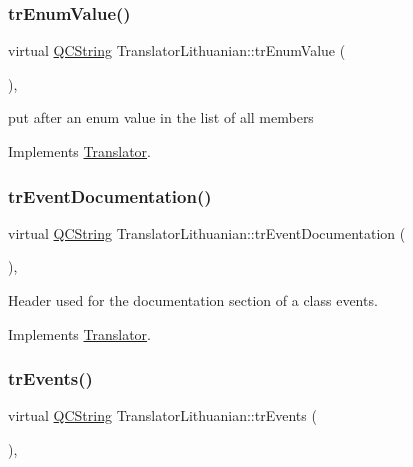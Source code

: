 \subsubsection{\texorpdfstring{trEnumValue()}{trEnumValue()}}
{\footnotesize\ttfamily virtual \mbox{\hyperlink{class_q_c_string}{Q\+C\+String}} Translator\+Lithuanian\+::tr\+Enum\+Value (\begin{DoxyParamCaption}{ }\end{DoxyParamCaption})\hspace{0.3cm}{\ttfamily [inline]}, {\ttfamily [virtual]}}

put after an enum value in the list of all members 

Implements \mbox{\hyperlink{class_translator}{Translator}}.

\mbox{\label{class_translator_lithuanian_adec683c693165e685a6275c8a525c8e7}} 
\subsubsection{\texorpdfstring{trEventDocumentation()}{trEventDocumentation()}}
{\footnotesize\ttfamily virtual \mbox{\hyperlink{class_q_c_string}{Q\+C\+String}} Translator\+Lithuanian\+::tr\+Event\+Documentation (\begin{DoxyParamCaption}{ }\end{DoxyParamCaption})\hspace{0.3cm}{\ttfamily [inline]}, {\ttfamily [virtual]}}

Header used for the documentation section of a class\textquotesingle{} events. 

Implements \mbox{\hyperlink{class_translator}{Translator}}.

\mbox{\label{class_translator_lithuanian_a28550142ee50b966aa8a6bc79e95fff6}} 
\subsubsection{\texorpdfstring{trEvents()}{trEvents()}}
{\footnotesize\ttfamily virtual \mbox{\hyperlink{class_q_c_string}{Q\+C\+String}} Translator\+Lithuanian\+::tr\+Events (\begin{DoxyParamCaption}{ }\end{DoxyParamCaption})\hspace{0.3cm}{\ttfamily [inline]}, {\ttfamily [virtual]}}

